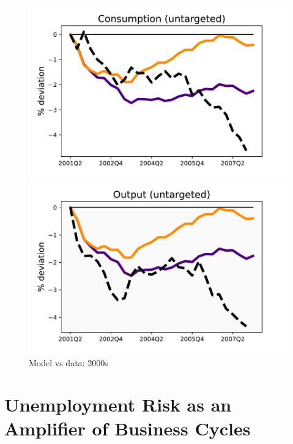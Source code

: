 \begin{figure}[H]
\medskip
\begin{minipage}{0.51\textwidth}
\includegraphics[scale=.57]{text/chapter1/Figures/2000s/PCE_00s}
\end{minipage}\hspace*{\fill}
\begin{minipage}{0.51\textwidth}
\includegraphics[scale=.57]{text/chapter1/Figures/2000s/GDP_00s}
\end{minipage}
\caption{Model vs data: 2000s}
\label{00s_recessions}
\end{figure}






\section{Unemployment Risk as an Amplifier of Business Cycles}
\label{appendix:Urisk}

